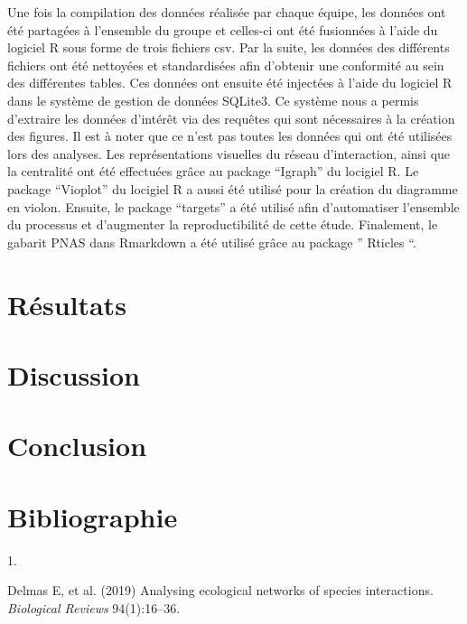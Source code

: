 \documentclass[9pt,twocolumn,twoside,]{pnas-new}
\newlength{\cslhangindent}
\newlength{\csllabelwidth}
\newlength{\cslentryspacingunit} %
\newenvironment{CSLReferences}[2] %
 {%
  \setlength{\parindent}{0pt}
  \ifodd #1
  \let\oldpar\par
  \def\par{\hangindent=\cslhangindent\oldpar}
  \fi
  \setlength{\parskip}{#2\cslentryspacingunit}
 }%
 {}
\newcommand{\CSLLeftMargin}[1]{\parbox[t]{\csllabelwidth}{#1}}
\newcommand{\CSLRightInline}[1]{\parbox[t]{\linewidth - \csllabelwidth}{#1}\break}
\begin{document}
Une fois la compilation des données réalisée par chaque équipe, les
données ont été partagées à l'ensemble du groupe et celles-ci ont été
fusionnées à l'aide du logiciel R sous forme de trois fichiers csv. Par
la suite, les données des différents fichiers ont été nettoyées et
standardisées afin d'obtenir une conformité au sein des différentes
tables. Ces données ont ensuite été injectées à l'aide du logiciel R
dans le système de gestion de données SQLite3. Ce système nous a permis
d'extraire les données d'intérêt via des requêtes qui sont nécessaires à
la création des figures. Il est à noter que ce n'est pas toutes les
données qui ont été utilisées lors des analyses. Les représentations
visuelles du réseau d'interaction, ainsi que la centralité ont été
effectuées grâce au package ``Igraph'' du locigiel R. Le package
``Vioplot'' du locigiel R a aussi été utilisé pour la création du
diagramme en violon. Ensuite, le package ``targets'' a été utilisé afin
d'automatiser l'ensemble du processus et d'augmenter la reproductibilité
de cette étude. Finalement, le gabarit PNAS dans Rmarkdown a été utilisé
grâce au package '' Rticles ``.

\hypertarget{ruxe9sultats}{%
\section{Résultats}\label{ruxe9sultats}}

\hypertarget{discussion}{%
\section{Discussion}\label{discussion}}

\hypertarget{conclusion}{%
\section{Conclusion}\label{conclusion}}

\hypertarget{bibliographie}{%
\section*{Bibliographie}\label{bibliographie}}

\showmatmethods
\showacknow
\pnasbreak

\hypertarget{refs}{}
\begin{CSLReferences}{0}{0}
\leavevmode{}%
\CSLLeftMargin{1. }%
\CSLRightInline{Delmas E, et al. (2019) Analysing ecological networks of
species interactions. \emph{Biological Reviews} 94(1):16--36.}

\end{CSLReferences}



% 
\end{document}
